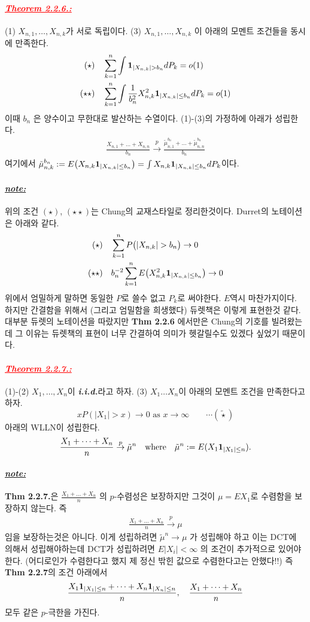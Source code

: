 \documentclass[12pt,oneside,english,a4paper]{article}
\def\note{\paragraph{\Large\textit{\underline{note:}}}\Large}
\newcommand{\parared}[1]{\paragraph{\Large\textcolor{red}{\it\underline{\textbf{#1:}}}}\Large}
\begin{document}
\parared{Theorem 2.2.6.} (1) $X_{n,1}, \dots, X_{n,k}$가 서로 독립이다. (3) $X_{n,1},\dots,X_{n,k}$	이 아래의 모멘트 조건들을 동시에 만족한다. 
\begin{align*}
({\star}) & \quad \sum_{k=1}^{n} \int {\bf 1}_{|X_{n,k}|>b_n} dP_k = o(1) \\
(\star\star) & \quad \sum_{k=1}^{n} \int  \frac{1}{b_n^2}X_{n,k}^2{\bf 1}_{|X_{n,k}| \leq b_n}dP_k = o(1)
\end{align*}
이때 $b_n$ 은 양수이고 무한대로 발산하는 수열이다. (1)-(3)의 가정하에 아래가 성립한다. 
\begin{align*}
\frac{X_{n,1}+\dots+X_{n,n} }{b_n} \overset{p}{\to} \frac{\tilde\mu_{n,1}^{b_n}+\dots+\tilde\mu_{n,n}^{b_n}}{b_n}
\end{align*}
여기에서 $\tilde\mu_{n,k}^{b_n}:=E\big(X_{n,k}{\bf 1}_ {|X_{n,k}|\leq b_n } \big)=\int X_{n,k}{\bf 1}_{|X_{n,k}|\leq b_n}dP_k$이다. 

\note 위의 조건 $(\star)$, $(\star\star)$는 Chung의 교재스타일로 정리한것이다. Durret의 노테이션은 아래와 같다. 
\begin{align*}
(\star) &\quad   \sum_{k=1}^{n} P\big(|X_{n,k}|>b_n\big) \to 0 \\
(\star\star) &\quad b_n^{-2}\sum_{k=1}^{n} E \big( X_ {n,k}^2 {\bf 1}_ {|X_{n,k}| \leq b_n} \big) \to 0 
\end{align*}
위에서 엄밀하게 말하면 동일한 $P$로 쓸수 없고 $P_k$로 써야한다. $E$역시 마찬가지이다. 하지만 간결함을 위해서 (그리고 엄밀함을 희생했다) 듀렛책은 이렇게 표현한것 같다. 대부분 듀렛의 노테이션을 따랐지만 \textbf{Thm 2.2.6} 에서만은 Chung의 기호를 빌려왔는데 그 이유는 듀렛책의 표현이 너무 간결하여 의미가 헷갈릴수도 있겠다 싶었기 때문이다. 

\parared{Theorem 2.2.7.} (1)-(2) $X_1, \dots, X_n$이 \textbf{\emph{i.i.d.}}라고 하자. (3) $X_1 \dots X_n$이 아래의 모멘트 조건을 만족한다고 하자. 
\[
xP(|X_1|> x ) \to 0 \mbox{ as } x \to \infty \quad \quad \cdots (\tilde\star)
\]
아래의 WLLN이 성립한다. 
\begin{align*}
\frac{X_1+\dots+X_n}{n} \overset{p}{\to} \tilde{\mu}^{n} \quad \mbox{where}\quad \tilde\mu^{n}:=E(X_1 {\bf 1}_{|X_1|\leq n}).
\end{align*}

\note \textbf{Thm 2.2.7.}은 $\frac{X_1+\dots+X_n}{n}$ 의 $p$-수렴성은 보장하지만 그것이 $\mu=EX_1$로 수렴함을 보장하지 않는다. 즉 
\begin{align*}
\frac{X_1+\dots+X_n}{n} \overset{p}{\to} \mu
\end{align*}
임을 보장하는것은 아니다. 이게 성립하려면 $\tilde\mu^{n} \to \mu$ 가 성립해야 하고 이는 DCT에 의해서 성립해야하는데 DCT가 성립하려면 $E|X_i|<\infty$ 의 조건이 추가적으로 있어야 한다. (어디로인가 수렴한다고 했지 제 정신 밖힌 값으로 수렴한다고는 안했다!!) 즉 \textbf{Thm 2.2.7}의 조건 아래에서 
\begin{align*}
\frac{X_1 {\bf 1}_ {|X_1| \leq n} +\dots+X_n {\bf 1}_ {|X_n| \leq n} }{n},  \quad \frac{X_1+\dots+X_n}{n}
\end{align*}
모두 같은 $p$-극한을 가진다. 
\end{document}
